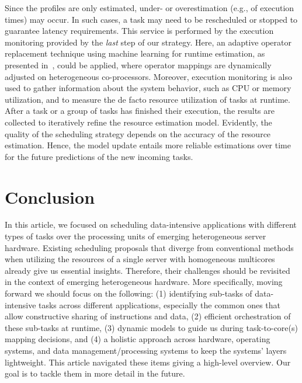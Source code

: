 \documentclass[11pt]{article}
\begin{document}
Since the profiles are only estimated, under- or overestimation (e.g., of execution times) may occur.
In such cases, a task may need to be rescheduled or stopped to guarantee latency requirements.
This service is performed by the execution monitoring provided by the \textit{last} step of our strategy.
Here, an adaptive operator replacement technique using machine learning for runtime estimation,
as presented in~\cite{Bress_2014},
could be applied, where operator mappings are dynamically adjusted on heterogeneous co-processors.
Moreover, execution monitoring is also used to gather information about the system behavior, such as CPU or memory utilization, and to measure the de facto resource utilization of tasks at runtime. After a task or a group of tasks has finished their execution, the results are collected to iteratively refine the resource estimation model. Evidently, the quality of the scheduling strategy depends on the accuracy of the resource estimation. Hence, the model update entails more reliable estimations over time for the future predictions of the new incoming tasks.

\section{Conclusion}
\label{sec:conc}

In this article,
we focused on scheduling data-intensive applications with different types of tasks
over the processing units of emerging heterogeneous server hardware.
Existing scheduling proposals that diverge from conventional methods when utilizing the resources
of a single server with homogeneous multicores already give us essential insights.
Therefore, their challenges should be revisited in the context of emerging heterogeneous hardware.
More specifically, moving forward we should focus on the following:
(1) identifying sub-tasks of data-intensive tasks across different applications,
especially the common ones that allow constructive sharing of instructions and data,
(2) efficient orchestration of these sub-tasks at runtime,
(3) dynamic models to guide us during task-to-core(s) mapping decisions, and
(4) a holistic approach across hardware, operating systems, and data management/processing systems
to keep the systems' layers lightweight.
This article navigated these items giving a high-level overview.
Our goal is to tackle them in more detail in the future.
\end{document}
